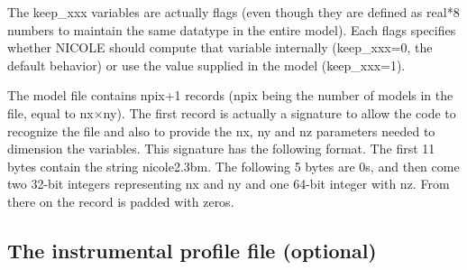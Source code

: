  The keep\_xxx variables are actually flags (even though they are
 defined as real*8 numbers to maintain the same datatype in the entire
 model). Each flags specifies whether NICOLE should compute that
 variable internally (keep\_xxx=0, the default behavior) or use the
 value supplied in the model (keep\_xxx=1).

The model file contains npix+1 records (npix being the number of models in
the file, equal to nx$\times$ny). The first record is actually a
signature to allow the code to recognize the file and also to provide
the nx, ny and nz parameters needed to dimension the variables. This
signature has the following format. The first 11 bytes contain the
string nicole2.3bm. The following 5 bytes are 0s, and then come two
32-bit integers representing nx and ny and one 64-bit integer with
nz. From there on the record is padded with zeros.

\subsection{The instrumental profile file (optional)}
\label{instprof}

